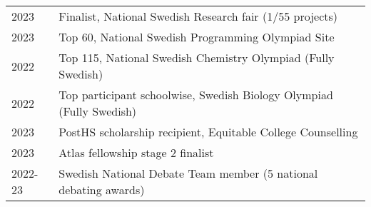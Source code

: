 
\begin{longtable}[l]{@{}p{} p{}}

    2023 & Finalist, National Swedish Research fair (1/55 projects) \\

    2023 & Top 60, National Swedish Programming Olympiad Site \\

    2022 & Top 115, National Swedish Chemistry Olympiad (Fully Swedish)\\

    2022 & Top participant schoolwise, Swedish Biology Olympiad (Fully Swedish)\\

    2023 & PostHS scholarship recipient, Equitable College Counselling\\

    2023 & Atlas fellowship stage 2 finalist\\
   
    2022-23 & Swedish National Debate Team member (5 national debating awards)\\
   
\end{longtable}

